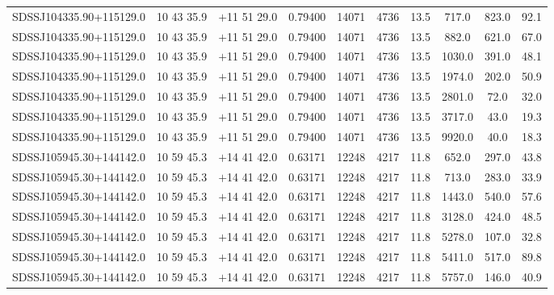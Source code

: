 \begin{landscape}
\begin{center}
\begin{longtable}{l c c c c c c c c c}
SDSSJ104335.90+115129.0  & 10 43 35.9  &         $+$11 51 29.0  &       0.79400  & 14071  &   4736  &       13.5  &      717.0  &   823.0  &  92.1  \\
SDSSJ104335.90+115129.0  & 10 43 35.9  &         $+$11 51 29.0  &       0.79400  & 14071  &   4736  &       13.5  &      882.0  &   621.0  &  67.0  \\
SDSSJ104335.90+115129.0  & 10 43 35.9  &         $+$11 51 29.0  &       0.79400  & 14071  &   4736  &       13.5  &      1030.0  &  391.0  &  48.1  \\
SDSSJ104335.90+115129.0  & 10 43 35.9  &         $+$11 51 29.0  &       0.79400  & 14071  &   4736  &       13.5  &      1974.0  &  202.0  &  50.9  \\
SDSSJ104335.90+115129.0  & 10 43 35.9  &         $+$11 51 29.0  &       0.79400  & 14071  &   4736  &       13.5  &      2801.0  &  72.0  &   32.0  \\
SDSSJ104335.90+115129.0  & 10 43 35.9  &         $+$11 51 29.0  &       0.79400  & 14071  &   4736  &       13.5  &      3717.0  &  43.0  &   19.3  \\
SDSSJ104335.90+115129.0  & 10 43 35.9  &         $+$11 51 29.0  &       0.79400  & 14071  &   4736  &       13.5  &      9920.0  &  40.0  &   18.3  \\
SDSSJ105945.30+144142.0  & 10 59 45.3  &         $+$14 41 42.0  &       0.63171  & 12248  &   4217  &       11.8  &      652.0  &   297.0  &  43.8  \\
SDSSJ105945.30+144142.0  & 10 59 45.3  &         $+$14 41 42.0  &       0.63171  & 12248  &   4217  &       11.8  &      713.0  &   283.0  &  33.9  \\
SDSSJ105945.30+144142.0  & 10 59 45.3  &         $+$14 41 42.0  &       0.63171  & 12248  &   4217  &       11.8  &      1443.0  &  540.0  &  57.6  \\
SDSSJ105945.30+144142.0  & 10 59 45.3  &         $+$14 41 42.0  &       0.63171  & 12248  &   4217  &       11.8  &      3128.0  &  424.0  &  48.5  \\
SDSSJ105945.30+144142.0  & 10 59 45.3  &         $+$14 41 42.0  &       0.63171  & 12248  &   4217  &       11.8  &      5278.0  &  107.0  &  32.8  \\
SDSSJ105945.30+144142.0  & 10 59 45.3  &         $+$14 41 42.0  &       0.63171  & 12248  &   4217  &       11.8  &      5411.0  &  517.0  &  89.8  \\
SDSSJ105945.30+144142.0  & 10 59 45.3  &         $+$14 41 42.0  &       0.63171  & 12248  &   4217  &       11.8  &      5757.0  &  146.0  &  40.9  \\

\end{longtable}
\end{center}
\end{landscape}
